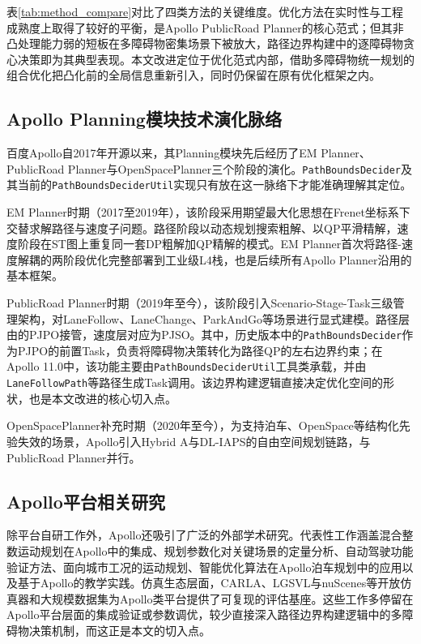 表\ref{tab:method_compare}对比了四类方法的关键维度。优化方法在实时性与工程成熟度上取得了较好的平衡，是Apollo PublicRoad Planner的核心范式；但其非凸处理能力弱的短板在多障碍物密集场景下被放大，路径边界构建中的逐障碍物贪心决策即为其典型表现。本文改进定位于优化范式内部，借助多障碍物统一规划的组合优化把凸化前的全局信息重新引入，同时仍保留在原有优化框架之内。

\subsection{Apollo Planning模块技术演化脉络}

百度Apollo自2017年开源以来，其Planning模块先后经历了EM Planner、PublicRoad Planner与OpenSpacePlanner三个阶段的演化。\texttt{PathBoundsDecider}及其当前的\texttt{PathBoundsDeciderUtil}实现只有放在这一脉络下才能准确理解其定位。

EM Planner时期（2017至2019年），该阶段采用期望最大化思想在Frenet坐标系下交替求解路径与速度子问题\cite{fan2018baidu}。路径阶段以动态规划搜索粗解、以QP平滑精解，速度阶段在ST图上重复同一套DP粗解加QP精解的模式。EM Planner首次将路径-速度解耦的两阶段优化完整部署到工业级L4栈，也是后续所有Apollo Planner沿用的基本框架。

PublicRoad Planner时期（2019年至今），该阶段引入Scenario-Stage-Task三级管理架构，对LaneFollow、LaneChange、ParkAndGo等场景进行显式建模。路径层由\citet{zhou2021pathqp}的PJPO接管，速度层对应为PJSO\cite{zhou2021dliaps}。其中，历史版本中的\texttt{PathBoundsDecider}作为PJPO的前置Task，负责将障碍物决策转化为路径QP的左右边界约束；在Apollo 11.0中，该功能主要由\texttt{PathBoundsDeciderUtil}工具类承载，并由\texttt{LaneFollowPath}等路径生成Task调用。该边界构建逻辑直接决定优化空间的形状，也是本文改进的核心切入点。

OpenSpacePlanner补充时期（2020年至今），为支持泊车、OpenSpace等结构化先验失效的场景，Apollo引入Hybrid A\*\cite{dolgov2008hybrid}与DL-IAPS\cite{zhou2021dliaps}的自由空间规划链路，与PublicRoad Planner并行。

\subsection{Apollo平台相关研究}

除平台自研工作外，Apollo还吸引了广泛的外部学术研究。代表性工作涵盖混合整数运动规划在Apollo中的集成\cite{kessler2023}、规划参数化对关键场景的定量分析\cite{li2023quant}、自动驾驶功能验证方法\cite{li2023valid}、面向城市工况的运动规划\cite{sun2023urban}、智能优化算法在Apollo泊车规划中的应用\cite{ma2023parking}以及基于Apollo的教学实践\cite{gao2024apollo}。仿真生态层面，CARLA\cite{dosovitskiy2017carla}、LGSVL\cite{rong2020lgsvl}与nuScenes\cite{caesar2020nuscenes}等开放仿真器和大规模数据集为Apollo类平台提供了可复现的评估基座。这些工作多停留在Apollo平台层面的集成验证或参数调优，较少直接深入路径边界构建逻辑中的多障碍物决策机制，而这正是本文的切入点。

